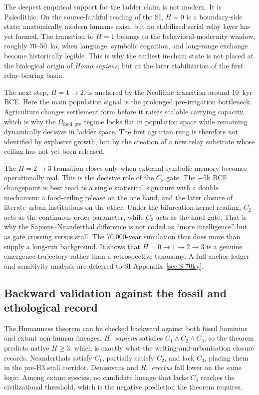 \documentclass[11pt]{article}
\begin{document}
The deepest empirical support for the ladder claim is not modern.
It is Paleolithic.
On the source-faithful reading of the SI,
\(H{=}0\) is a boundary-side state:
anatomically modern humans exist,
but no stabilized serial relay layer has yet formed.
The transition to \(H{=}1\) belongs to the behavioral-modernity window,
roughly 70--50~ka,
when language,
symbolic cognition,
and long-range exchange become historically legible.
This is why the earliest in-chain state is not placed at the biological origin of \emph{Homo sapiens},
but at the later stabilization of the first relay-bearing basin.

The next step,
\(H{=}1\to 2\),
is anchored by the Neolithic transition around 10~kyr BCE.
Here the main population signal is the prolonged pre-irrigation bottleneck.
Agriculture changes settlement form before it raises scalable carrying capacity,
which is why the \(\Omega_{\mathrm{food,pre}}\) regime looks flat in population space while remaining dynamically decisive in ladder space.
The first agrarian rung is therefore not identified by explosive growth,
but by the creation of a new relay substrate whose ceiling has not yet been released.

The \(H{=}2\to 3\) transition closes only when external symbolic memory becomes operationally real.
This is the decisive role of the
\(C_3\)
gate.
The \(-\)5k BCE changepoint is best read as a single statistical signature with a double mechanism:
a food-ceiling release on the one hand,
and the later closure of literate urban institutions on the other.
Under the bifurcation-kernel reading,
\(C_2\)
acts as the continuous order parameter,
while
\(C_3\)
acts as the hard gate.
That is why the Sapiens--Neanderthal difference is not coded as ``more intelligence'' but as gate crossing versus stall.
The 70,000-year simulation thus does more than supply a long-run background.
It shows that
\(H{=}0\to 1\to 2\to 3\)
is a genuine emergence trajectory rather than a retrospective taxonomy.
A full anchor ledger and sensitivity analysis are deferred to SI Appendix~\ref{sec:S-70ky}.

\subsection{Backward validation against the fossil and ethological record}\label{sec:backward}

The Humanness theorem can be checked backward against both fossil hominins and extant non-human lineages.
\emph{H.~sapiens}
satisfies
\(C_1\wedge C_2\wedge C_3\),
so the theorem predicts native
\(H\ge 3\),
which is exactly what the writing-and-urbanisation closure records.
Neanderthals satisfy
\(C_1\),
partially satisfy
\(C_2\),
and lack
\(C_3\),
placing them in the pre-H3 stall corridor.
Denisovans and
\emph{H.~erectus}
fall lower on the same logic.
Among extant species,
no candidate lineage that lacks
\(C_3\)
reaches the civilizational threshold,
which is the negative prediction the theorem requires.
\end{document}

